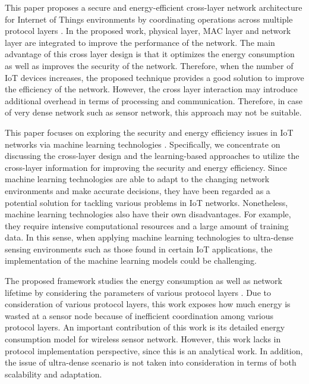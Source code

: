 \documentclass[a4paper,fleqn]{cas-dc}
\numberwithin{equation}{section}
\begin{document}
This paper proposes a secure and energy-efficient cross-layer network architecture for Internet of Things environments by coordinating operations across multiple protocol layers \cite{Mustafa2025}. In the proposed work, physical layer, MAC layer and network layer are integrated to improve the performance of the network. The main advantage of this cross layer design is that it optimizes the energy consumption as well as improves the security of the network. Therefore, when the number of IoT devices increases, the proposed technique provides a good solution to improve the efficiency of the network. However, the cross layer interaction may introduce additional overhead in terms of processing and communication. Therefore, in case of very dense network such as sensor network, this approach may not be suitable.

This paper focuses on exploring the security and energy efficiency issues in IoT networks via machine learning technologies \cite{Mustafa2O25}. Specifically, we concentrate on discussing the cross-layer design and the learning-based approaches to utilize the cross-layer information for improving the security and energy efficiency. Since machine learning technologies are able to adapt to the changing network environments and make accurate decisions, they have been regarded as a potential solution for tackling various problems in IoT networks. Nonetheless, machine learning technologies also have their own disadvantages. For example, they require intensive computational resources and a large amount of training data. In this sense, when applying machine learning technologies to ultra-dense sensing environments such as those found in certain IoT applications, the implementation of the machine learning models could be challenging.

The proposed framework studies the energy consumption as well as network lifetime by considering the parameters of various protocol layers \cite{Ojeda2024}. Due to consideration of various protocol layers, this work exposes how much energy is wasted at a sensor node because of inefficient coordination among various protocol layers. An important contribution of this work is its detailed energy consumption model for wireless sensor network. However, this work lacks in protocol implementation perspective, since this is an analytical work. In addition, the issue of ultra-dense scenario is not taken into consideration in terms of both scalability and adaptation.
\end{document}
